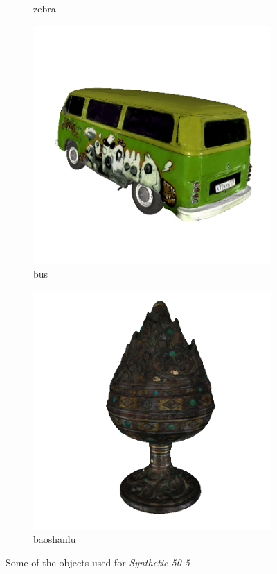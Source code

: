 \begin{figure}[!h]
\begin{subfigure}[b]{0.24\linewidth}
		\caption{zebra}
	\end{subfigure}
	\begin{subfigure}[b]{0.24\linewidth}
		\includegraphics[width=\linewidth]{./Figures/test-dataset/01.bus_texture.png}
		\caption{bus}
	\end{subfigure}
	\begin{subfigure}[b]{0.24\linewidth}
		\includegraphics[width=\linewidth]{./Figures/test-dataset/03.baoshanlu_texture.png}
		\caption{baoshanlu}
	\end{subfigure}
	\decoRule
	\caption{Some of the objects used for \textit{Synthetic-50-5}}
	\label{fig:dataset-demo}
\end{figure}
